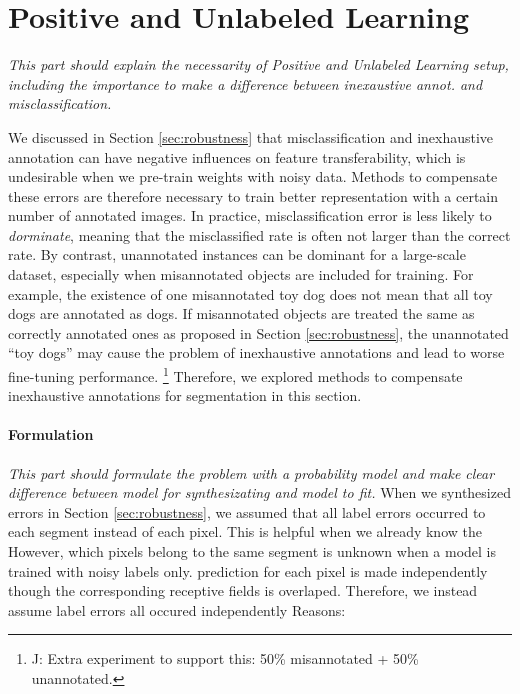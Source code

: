 \section{Positive and Unlabeled Learning}
\label{sec:pulearning}

\noindent \textit{This part should explain the necessarity of Positive and Unlabeled Learning setup, including the importance to make a difference between inexaustive annot. and misclassification.}

\noindent
We discussed in Section \ref{sec:robustness} that misclassification and inexhaustive annotation can have negative influences on feature transferability, which is undesirable when we pre-train weights with noisy data.
Methods to compensate these errors are therefore necessary to train better representation with a certain number of annotated images.
In practice, misclassification error is less likely to \textit{dorminate}, meaning that the misclassified rate is often not larger than the correct rate.
By contrast, unannotated instances can be dominant for a large-scale dataset, especially when misannotated objects are included for training.
For example, the existence of one misannotated toy dog does not mean that all toy dogs are annotated as dogs.
If misannotated objects are treated the same as correctly annotated ones as proposed in Section \ref{sec:robustness}, the unannotated ``toy dogs'' may cause the problem of inexhaustive annotations and lead to worse fine-tuning performance.
\footnote{J: Extra experiment to support this: 50\% misannotated + 50\% unannotated.}
Therefore, we explored methods to compensate inexhaustive annotations for segmentation in this section.


\paragraph{Formulation}
\noindent \textit{This part should formulate the problem with a probability model and make clear difference between model for synthesizating and model to fit.}
\noindent
When we synthesized errors in Section \ref{sec:robustness}, we assumed that  all label errors occurred to each segment instead of each pixel.
This is helpful when we already know the
However, which pixels belong to the same segment is unknown when a model is trained with noisy labels only.
prediction for each pixel is made independently though the corresponding receptive fields is overlaped.
Therefore, we instead assume label errors all occured independently
Reasons:

